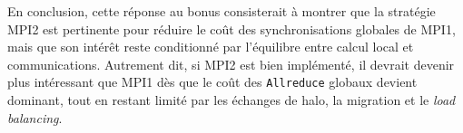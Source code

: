 En conclusion, cette réponse au bonus consisterait à montrer que la stratégie MPI2 est
pertinente pour réduire le coût des synchronisations globales de MPI1, mais que son intérêt
reste conditionné par l'équilibre entre calcul local et communications.
Autrement dit, si MPI2 est bien implémenté, il devrait devenir plus intéressant que MPI1
dès que le coût des \texttt{Allreduce} globaux devient dominant, tout en restant limité
par les échanges de halo, la migration et le \emph{load balancing}.
